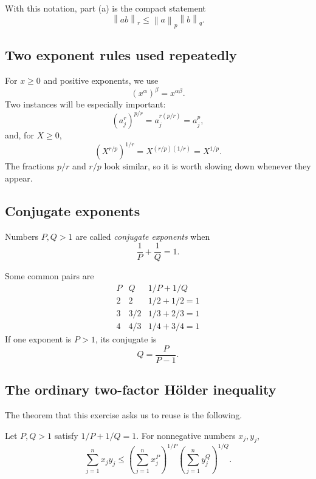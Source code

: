 \documentclass[11pt]{article}
\newcommand{\norm}[1]{\left\lVert #1\right\rVert}
\begin{document}
With this notation, part (a) is the compact statement
\[
  \norm{ab}_r\leq \norm{a}_p\norm{b}_q.
  \tag{2}
\]

\subsection{Two exponent rules used repeatedly}

For \(x\geq0\) and positive exponents, we use
\[
  (x^\alpha)^\beta=x^{\alpha\beta}.
  \tag{3}
\]
Two instances will be especially important:
\[
  \left(a_j^r\right)^{p/r}=a_j^{r(p/r)}=a_j^p,
  \tag{4}
\]
and, for \(X\geq0\),
\[
  \left(X^{r/p}\right)^{1/r}=X^{(r/p)(1/r)}=X^{1/p}.
  \tag{5}
\]
The fractions \(p/r\) and \(r/p\) look similar, so it is worth slowing down whenever they appear.

\subsection{Conjugate exponents}

\begin{definitionBox}
Numbers \(P,Q>1\) are called \emph{conjugate exponents} when
\[
  \frac1P+\frac1Q=1.
  \tag{6}
\]
\end{definitionBox}

Some common pairs are
\[
\begin{array}{c|c|c}
P & Q & 1/P+1/Q\\ \hline
2 & 2 & 1/2+1/2=1\\[2pt]
3 & 3/2 & 1/3+2/3=1\\[2pt]
4 & 4/3 & 1/4+3/4=1
\end{array}
\]
If one exponent is \(P>1\), its conjugate is
\[
  Q=\frac{P}{P-1}.
\]

\subsection{The ordinary two-factor H\"older inequality}

The theorem that this exercise asks us to reuse is the following.

\begin{definitionBox}
Let \(P,Q>1\) satisfy \(1/P+1/Q=1\). For nonnegative numbers \(x_j,y_j\),
\[
  \boxed{\displaystyle
  \sum_{j=1}^{n}x_jy_j
  \leq
  \left(\sum_{j=1}^{n}x_j^P\right)^{1/P}
  \left(\sum_{j=1}^{n}y_j^Q\right)^{1/Q}.}
  \tag{H}
\]
\end{definitionBox}
\end{document}
